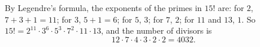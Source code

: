 By Legendre's formula, the exponents of the primes in $15!$ are: for $2$, $7+3+1=11$; for $3$, $5+1=6$; for $5$, $3$; for $7$, $2$; for $11$ and $13$, $1$. So $15!=2^{11}\cdot3^6\cdot5^3\cdot7^2\cdot11\cdot13$, and the number of divisors is
\[12\cdot7\cdot4\cdot3\cdot2\cdot2=\boxed{4032}.\]
